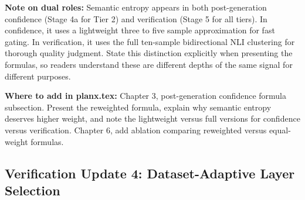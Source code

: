 \documentclass[11pt,a4paper]{article}
\begin{document}
{\textbf{Note on dual roles:} Semantic entropy appears in both post-generation confidence (Stage 4a for Tier 2) and verification (Stage 5 for all tiers). In confidence, it uses a lightweight three to five sample approximation for fast gating. In verification, it uses the full ten-sample bidirectional NLI clustering for thorough quality judgment. State this distinction explicitly when presenting the formulas, so readers understand these are different depths of the same signal for different purposes.

\textbf{Where to add in planx.tex:} Chapter 3, post-generation confidence formula subsection. Present the reweighted formula, explain why semantic entropy deserves higher weight, and note the lightweight versus full versions for confidence versus verification. Chapter 6, add ablation comparing reweighted versus equal-weight formulas.
}

\subsection{Verification Update 4: Dataset-Adaptive Layer Selection}
\end{document}
